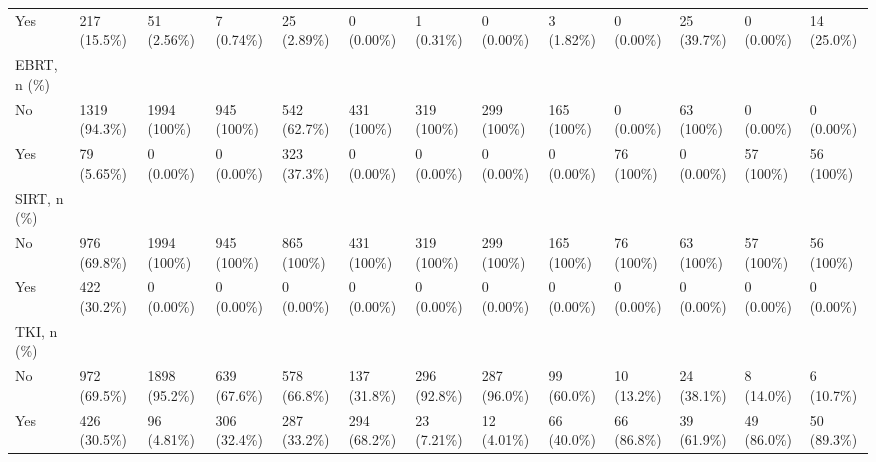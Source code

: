 \begin{landscape}
\begin{center}
\begin{longtable}{p{6.0cm}p{3.0cm}p{3.0cm}p{3.0cm}p{3.0cm}p{3.0cm}p{3.0cm}p{3.0cm}p{3.0cm}p{3.0cm}p{3.0cm}p{3.0cm}p{3.0cm}}
    Yes &   217 (15.5\%)    &    51 (2.56\%)    &    7 (0.74\%)     &    25 (2.89\%)    &    0 (0.00\%)     &    1 (0.31\%)     &    0 (0.00\%)     &    3 (1.82\%)     &    0 (0.00\%)     &    25 (39.7\%)    &    0 (0.00\%)     &    14 (25.0\%)    \\
EBRT, n (\%) &                  &                  &                  &                  &                  &                  &                  &                  &                  &                  &                  &                  \\
    No &   1319 (94.3\%)   &   1994 (100\%)    &    945 (100\%)    &   542 (62.7\%)    &    431 (100\%)    &    319 (100\%)    &    299 (100\%)    &    165 (100\%)    &    0 (0.00\%)     &    63 (100\%)     &    0 (0.00\%)     &    0 (0.00\%)     \\
    Yes &    79 (5.65\%)    &    0 (0.00\%)     &    0 (0.00\%)     &   323 (37.3\%)    &    0 (0.00\%)     &    0 (0.00\%)     &    0 (0.00\%)     &    0 (0.00\%)     &    76 (100\%)     &    0 (0.00\%)     &    57 (100\%)     &    56 (100\%)     \\
SIRT, n (\%) &                  &                  &                  &                  &                  &                  &                  &                  &                  &                  &                  &                  \\
    No &   976 (69.8\%)    &   1994 (100\%)    &    945 (100\%)    &    865 (100\%)    &    431 (100\%)    &    319 (100\%)    &    299 (100\%)    &    165 (100\%)    &    76 (100\%)     &    63 (100\%)     &    57 (100\%)     &    56 (100\%)     \\
    Yes &   422 (30.2\%)    &    0 (0.00\%)     &    0 (0.00\%)     &    0 (0.00\%)     &    0 (0.00\%)     &    0 (0.00\%)     &    0 (0.00\%)     &    0 (0.00\%)     &    0 (0.00\%)     &    0 (0.00\%)     &    0 (0.00\%)     &    0 (0.00\%)     \\
TKI, n (\%) &                  &                  &                  &                  &                  &                  &                  &                  &                  &                  &                  &                  \\
    No &   972 (69.5\%)    &   1898 (95.2\%)   &   639 (67.6\%)    &   578 (66.8\%)    &   137 (31.8\%)    &   296 (92.8\%)    &   287 (96.0\%)    &    99 (60.0\%)    &    10 (13.2\%)    &    24 (38.1\%)    &    8 (14.0\%)     &    6 (10.7\%)     \\
    Yes &   426 (30.5\%)    &    96 (4.81\%)    &   306 (32.4\%)    &   287 (33.2\%)    &   294 (68.2\%)    &    23 (7.21\%)    &    12 (4.01\%)    &    66 (40.0\%)    &    66 (86.8\%)    &    39 (61.9\%)    &    49 (86.0\%)    &    50 (89.3\%)    \\

\end{longtable}
\end{center}
\end{landscape}
